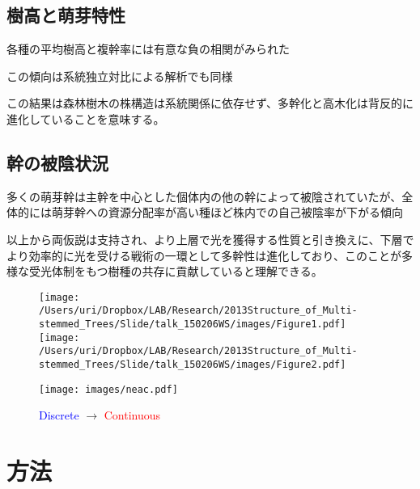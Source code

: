 \documentclass[a0, 30pt, plainboxedsections]{sciposter} %
\begin{document}
\subsection*{樹高と萌芽特性}

\begin{list}{}{\setlength{\itemindent}{1em}}
  \item 各種の平均樹高と複幹率には有意な負の相関がみられた
  \item この傾向は系統独立対比による解析でも同様
\end{list}

この結果は森林樹木の株構造は系統関係に依存せず、多幹化と高木化は背反的に進化していることを意味する。


\subsection*{幹の被陰状況}

多くの萌芽幹は主幹を中心とした個体内の他の幹によって被陰されていたが、全体的には萌芽幹への資源分配率が高い種ほど株内での自己被陰率が下がる傾向

以上から両仮説は支持され、より上層で光を獲得する性質と引き換えに、下層でより効率的に光を受ける戦術の一環として多幹性は進化しており、このことが多様な受光体制をもつ樹種の共存に貢献していると理解できる。

\begin{figure}
	\begin{center}
		\texttt{[image: /Users/uri/Dropbox/LAB/Research/2013Structure\_of\_Multi-stemmed\_Trees/Slide/talk\_150206WS/images/Figure1.pdf]}
		\texttt{[image: /Users/uri/Dropbox/LAB/Research/2013Structure\_of\_Multi-stemmed\_Trees/Slide/talk\_150206WS/images/Figure2.pdf]}
	\end{center}
\end{figure}

\begin{figure}[H]
  \begin{center}
	\texttt{[image: images/neac.pdf]}
	{\small\caption{{\textcolor{blue}{Discrete}} $\rightarrow$ {\textcolor{red}{Continuous}}}}
  \end{center}
\end{figure}

\section*{\huge{方法}}
\end{document}
